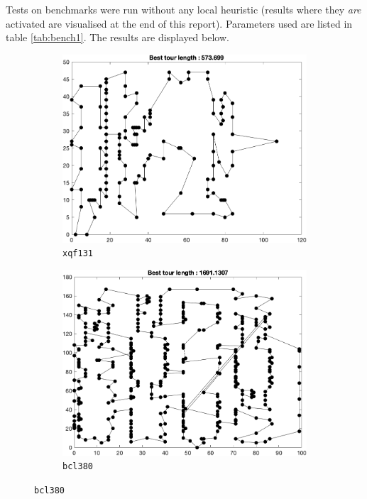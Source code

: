 Tests on benchmarks were run without any local heuristic (results where they \textit{are} activated are visualised at the end of this report). Parameters used are listed in table \ref{tab:bench1}. The results are displayed below.

\begin{figure}[H]
	\centering
%
	\begin{subfigure}[b]{0.45\textwidth}
		\centering
		\includegraphics[width=\textwidth]{benchmarks/xqf131.png}
		\caption{\texttt{xqf131}}
    	\end{subfigure}
	\begin{subfigure}[b]{0.45\textwidth}
		\centering
		\includegraphics[width=\textwidth]{benchmarks/bcl380.png}
		\caption{\texttt{bcl380}}
    	\end{subfigure}
\end{figure}
